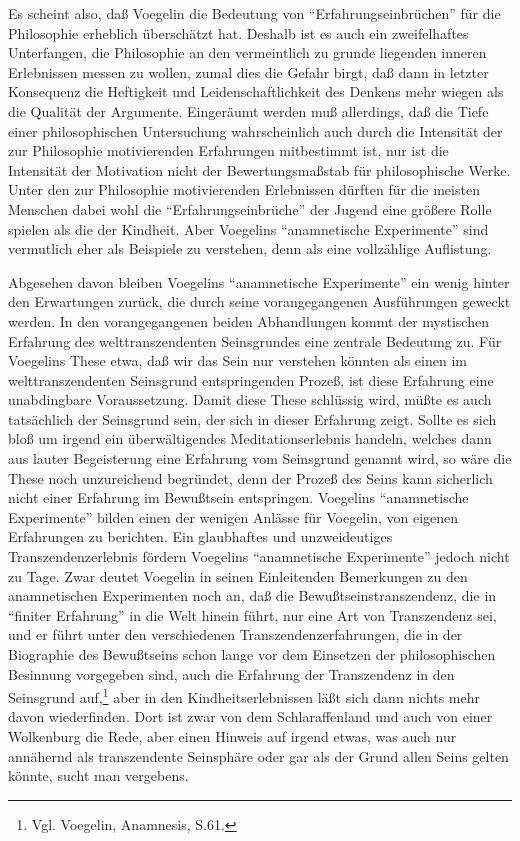 Es scheint also, daß Voegelin die Bedeutung von "`Erfahrungseinbrüchen"' für
die Philosophie erheblich überschätzt hat. Deshalb ist es auch ein
zweifelhaftes Unterfangen, die Philosophie an den vermeintlich zu grunde
liegenden inneren Erlebnissen messen zu wollen, zumal dies die Gefahr birgt,
daß dann in letzter Konsequenz die Heftigkeit und Leidenschaftlichkeit
des Denkens mehr wiegen als die Qualität der Argumente. Eingeräumt werden muß
allerdings, daß die Tiefe einer philosophischen Untersuchung wahrscheinlich
auch durch die Intensität der zur Philosophie motivierenden Erfahrungen
mitbestimmt ist, nur ist die Intensität der Motivation nicht der
Bewertungsmaßstab für philosophische Werke. Unter den zur Philosophie
motivierenden Erlebnissen dürften für die meisten Menschen dabei wohl die
"`Erfahrungseinbrüche"' der Jugend eine größere Rolle spielen als die der
Kindheit. Aber Voegelins "`anamnetische Experimente"' sind vermutlich eher als
Beispiele zu verstehen, denn als eine vollzählige Auflistung.

Abgesehen davon bleiben Voegelins "`anamnetische Experimente"' ein wenig
hinter den Erwartungen zurück, die durch seine vorangegangenen Ausführungen
geweckt werden. In den vorangegangenen beiden Abhandlungen kommt der
mystischen Erfahrung des welttranszendenten Seinsgrundes eine zentrale
Bedeutung zu. Für Voegelins These etwa, daß wir das Sein nur verstehen könnten
als einen im welttranszendenten Seinsgrund entspringenden Prozeß, ist diese
Erfahrung eine unabdingbare Voraussetzung. Damit diese These schlüssig wird,
müßte es auch tatsächlich der Seinsgrund sein, der sich in dieser Erfahrung
zeigt. Sollte es sich bloß um irgend ein überwältigendes Meditationserlebnis
handeln, welches dann aus lauter Begeisterung eine Erfahrung vom Seinsgrund
genannt wird, so wäre die These noch unzureichend begründet, denn der Prozeß
des Seins kann sicherlich nicht einer Erfahrung im Bewußtsein entspringen.
Voegelins "`anamnetische Experimente"' bilden einen der wenigen Anlässe für
Voegelin, von eigenen Erfahrungen zu berichten.  Ein glaubhaftes und
unzweideutiges Transzendenzerlebnis fördern Voegelins "`anamnetische
Experimente"' jedoch nicht zu Tage. Zwar deutet Voegelin in seinen
Einleitenden Bemerkungen zu den anamnetischen Experimenten noch an, daß die
Bewußtseinstranszendenz, die in "`finiter Erfahrung"' in die Welt hinein
führt, nur eine Art von Transzendenz sei, und er führt unter den verschiedenen
Transzendenzerfahrungen, die in der Biographie des Bewußtseins schon lange vor
dem Einsetzen der philosophischen Besinnung vorgegeben sind, auch die
Erfahrung der Transzendenz in den Seinsgrund auf,\footnote{Vgl.  Voegelin,
  Anamnesis, S.61.} aber in den Kindheitserlebnissen läßt sich dann nichts
mehr davon wiederfinden. Dort ist zwar von dem Schlaraffenland und auch von
einer Wolkenburg die Rede, aber einen Hinweis auf irgend etwas, was auch nur
annähernd als transzendente Seinsphäre oder gar als der Grund allen Seins
gelten könnte, sucht man vergebens.


